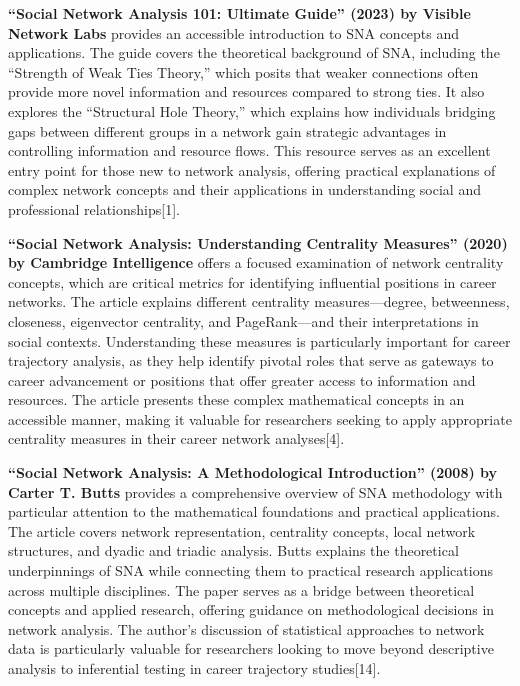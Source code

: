 \documentclass[
  letterpaper,
  DIV=11,
  numbers=noendperiod]{scrartcl}
\begin{document}
\textbf{``Social Network Analysis 101: Ultimate Guide'' (2023) by
Visible Network Labs} provides an accessible introduction to SNA
concepts and applications. The guide covers the theoretical background
of SNA, including the ``Strength of Weak Ties Theory,'' which posits
that weaker connections often provide more novel information and
resources compared to strong ties. It also explores the ``Structural
Hole Theory,'' which explains how individuals bridging gaps between
different groups in a network gain strategic advantages in controlling
information and resource flows. This resource serves as an excellent
entry point for those new to network analysis, offering practical
explanations of complex network concepts and their applications in
understanding social and professional relationships{[}1{]}.

\textbf{``Social Network Analysis: Understanding Centrality Measures''
(2020) by Cambridge Intelligence} offers a focused examination of
network centrality concepts, which are critical metrics for identifying
influential positions in career networks. The article explains different
centrality measures---degree, betweenness, closeness, eigenvector
centrality, and PageRank---and their interpretations in social contexts.
Understanding these measures is particularly important for career
trajectory analysis, as they help identify pivotal roles that serve as
gateways to career advancement or positions that offer greater access to
information and resources. The article presents these complex
mathematical concepts in an accessible manner, making it valuable for
researchers seeking to apply appropriate centrality measures in their
career network analyses{[}4{]}.

\textbf{``Social Network Analysis: A Methodological Introduction''
(2008) by Carter T. Butts} provides a comprehensive overview of SNA
methodology with particular attention to the mathematical foundations
and practical applications. The article covers network representation,
centrality concepts, local network structures, and dyadic and triadic
analysis. Butts explains the theoretical underpinnings of SNA while
connecting them to practical research applications across multiple
disciplines. The paper serves as a bridge between theoretical concepts
and applied research, offering guidance on methodological decisions in
network analysis. The author's discussion of statistical approaches to
network data is particularly valuable for researchers looking to move
beyond descriptive analysis to inferential testing in career trajectory
studies{[}14{]}.
\end{document}
